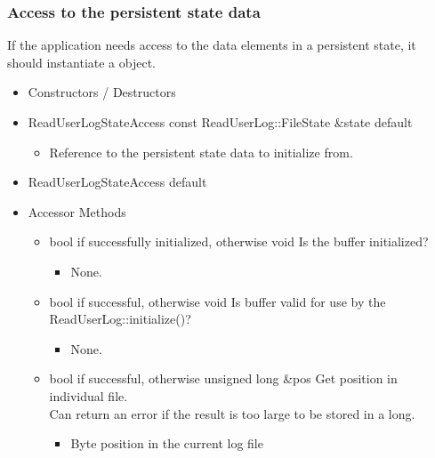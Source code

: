 \subsubsection{Access to the persistent state data}
If the application needs access to the data elements in a persistent
state, it should instantiate a  object.

\begin{itemize}
\item Constructors / Destructors

\item \Constructor
  {ReadUserLogStateAccess}
  {const ReadUserLog::FileState \&state}
  {default}
  \begin{itemize}
  \item {}
    Reference to the persistent state data to initialize from.
  \end{itemize}

\item \Destructor
  {ReadUserLogStateAccess}
  {default}

\item Accessor Methods
\begin{itemize}

\item {}
  {bool} { if successfully initialized,  otherwise}
  {void}
  {Is the buffer initialized?}
  \begin{itemize} \item None. \end{itemize}

\item {}
  {bool} { if successful,  otherwise}
  {void}
  {Is buffer valid for use by the ReadUserLog::initialize()?}
  \begin{itemize} \item None. \end{itemize}

\item {}
  {bool} { if successful,  otherwise}
  {unsigned long \&pos}
  {Get position in individual file.
    \\ \Note Can return an error if the result is too large to be
    stored in a long.}
  \begin{itemize}
  \item {}
    Byte position in the current log file
  \end{itemize}


\end{itemize}
\end{itemize}
